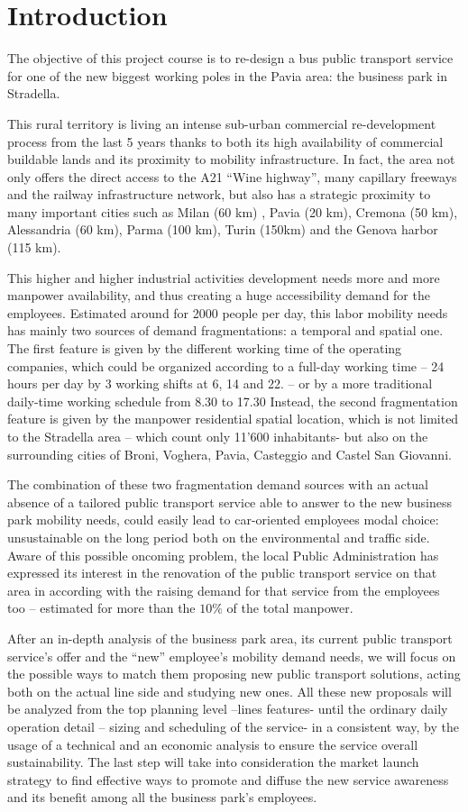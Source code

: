 \chapter{Introduction}
The objective of this project course is to re-design a bus public transport service for one of the new biggest working poles in the Pavia area: the business park in Stradella.

This rural territory is living an intense sub-urban commercial re-development process from the last 5 years thanks to both its high availability of commercial buildable lands and its proximity to mobility infrastructure. In fact, the area not only offers the direct access to the A21 “Wine highway”, many capillary freeways and the railway infrastructure network, but also has a strategic proximity to many important cities such as Milan (60 km) ,  Pavia (20 km), Cremona (50 km),  Alessandria (60 km), Parma (100 km), Turin (150km) and the Genova harbor (115 km).

This higher and higher industrial activities development needs more and more manpower availability, and thus creating a huge accessibility demand for the employees. Estimated around for 2000 people per day, this labor mobility needs has mainly two sources of demand fragmentations: a temporal and spatial one. The first feature is given by the different working time of the operating companies, which could be organized according to a full-day working time – 24 hours per day by 3 working shifts at 6, 14 and 22. – or by a more traditional daily-time working schedule from 8.30 to 17.30  Instead, the second fragmentation feature is given by the manpower residential spatial location, which is not limited to the Stradella area – which count only 11’600 inhabitants- but also on the surrounding cities of Broni, Voghera, Pavia, Casteggio and Castel San Giovanni.

The combination of these two fragmentation demand sources with an actual absence of a tailored public transport service able to answer to the new business park mobility needs, could easily lead to car-oriented employees modal choice: unsustainable on the long period both on the environmental and traffic side. Aware of this possible oncoming problem, the local Public Administration has expressed its interest in the renovation of the public transport service on that area in according with the raising demand for that service from the employees too – estimated for more than the $10\%$ of the total manpower.

After an in-depth analysis of the business park area, its current public transport service’s offer and the “new” employee’s mobility demand needs, we will focus on the possible ways to match them proposing new public transport solutions, acting both on the actual line side and studying new ones. All these new proposals will be analyzed from the top planning level –lines features- until the ordinary daily operation detail – sizing and scheduling of the service- in a consistent way, by the usage of a technical and an economic analysis to ensure the service overall sustainability. The last step will take into consideration the market launch strategy to find effective ways to promote and diffuse the new service awareness and its benefit among all the business park’s employees. 

